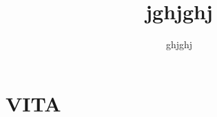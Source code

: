\setlength{\mathindent}{ 0pt}

\renewcommand{\baselinestretch}{1.6}
\newtheorem{theorem}{Theorem}[chapter]
\newcommand{\btheorem}{\begin{theorem}\rm}
\newcommand{\etheorem}{$\diamond$\end{theorem}}
\newtheorem{definition}{Definition}[chapter]
\newcommand{\bdefn}{\begin{definition}\rm}
\newcommand{\edefn}{\end{definition}}
\newtheorem{lemma}{Lemma}[chapter]
\newtheorem{remark}{Remark}[chapter]
\newcommand{\bremark}{\begin{remark}\rm}
\newcommand{\eremark}{\end{remark}}
\newtheorem{example}{Example}[chapter]
\newcommand{\bexample}{\begin{example}\rm}
\newcommand{\eexample}{\end{example}}
\newtheorem{assumption}{Assumption}[chapter]
\newcommand{\bassump}{\begin{assumption}\rm}
\newcommand{\eassump}{\end{assumption}}

\title{jghjghj}
\author{ghjghj}
\mstitlepage
\topmargin=0.4in
\textwidth=6.0in
\textheight=9.0in
\chapter*{VITA}
\vitaentry{}{}
\vitaentry{}{}
\vitaentry{}{}
\setcounter{page}{1}



\tableofcontents
\listoffigures
\listoftables

\newpage
\setcounter{page}{1}






